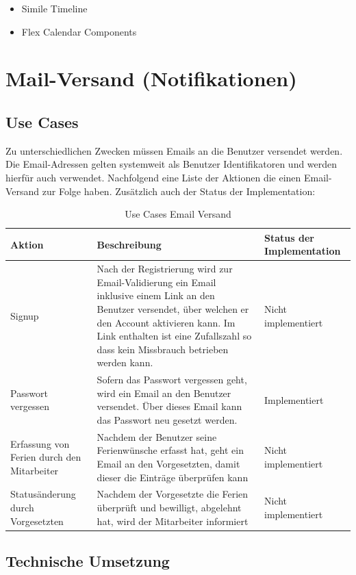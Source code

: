 \begin{itemize}
\item Simile Timeline\cite{simileTimeline}
\item Flex Calendar Components \cite{flexCalendar}
\end{itemize}


\section{Mail-Versand (Notifikationen)}
\subsection{Use Cases}
Zu unterschiedlichen Zwecken m\"ussen  Emails an die Benutzer versendet werden. Die Email-Adressen gelten systemweit als Benutzer Identifikatoren und werden hierf\"ur auch verwendet. Nachfolgend eine Liste der Aktionen die einen Email-Versand zur Folge haben. Zus\"atzlich auch der Status der Implementation:
  \begin{longtable}{|p{3cm}|p{7cm}|p{3cm}|}
      \caption{Use Cases Email Versand}\\
\hline
  \textbf{Aktion} & \textbf{Beschreibung} & \textbf{Status der Implementation}\\
  \hline
  Signup&Nach der Registrierung wird zur Email-Validierung ein Email inklusive einem Link an den Benutzer versendet, \"uber welchen er den Account aktivieren kann. Im Link enthalten ist eine Zufallszahl so dass kein Missbrauch betrieben werden kann. & Nicht implementiert\\
  \hline
  Passwort vergessen&Sofern das Passwort vergessen geht, wird ein Email an den Benutzer versendet. \"Uber dieses Email kann das Passwort neu gesetzt werden. & Implementiert\\
  \hline
  Erfassung von Ferien durch den Mitarbeiter & Nachdem der Benutzer seine Ferienw\"unsche erfasst hat, geht ein Email an den Vorgesetzten, damit dieser die Eintr\"age \"uberpr\"ufen kann & Nicht implementiert \\
  \hline
  Status\"anderung durch Vorgesetzten & Nachdem der Vorgesetzte die Ferien \"uberpr\"uft und bewilligt, abgelehnt hat, wird der Mitarbeiter informiert & Nicht implementiert\\
  \hline
\end{longtable}
 
 \subsection{Technische Umsetzung}
